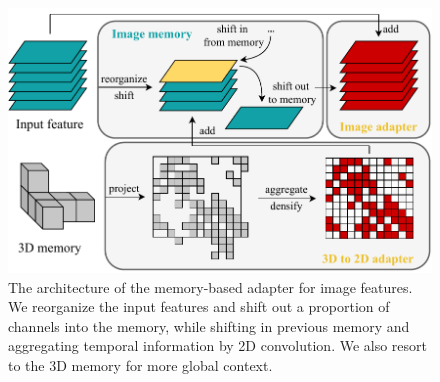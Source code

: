 \begin{figure}[t]
    \centering
    \includegraphics[width=1.0\linewidth]{figures/img-module-single.pdf}
    \caption{The architecture of the memory-based adapter for image features. We reorganize the input features and shift out a proportion of channels into the memory, while shifting in previous memory and aggregating temporal information by 2D convolution. We also resort to the 3D memory for more global context.}
    \label{img-module}
\end{figure}


